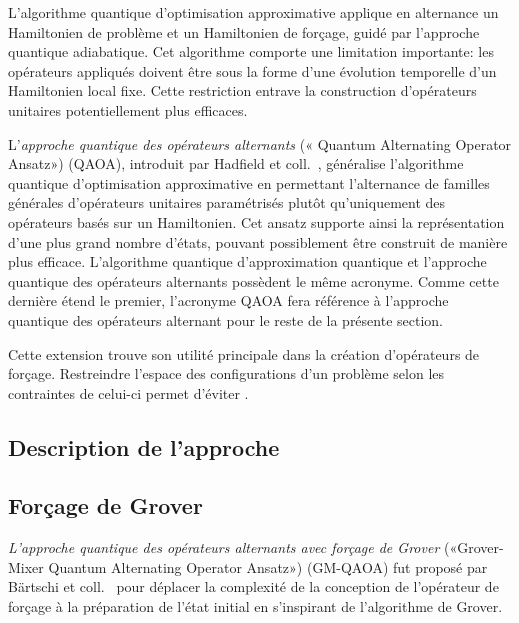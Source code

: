 L'algorithme quantique d'optimisation approximative applique en alternance un Hamiltonien de problème et un Hamiltonien de forçage, guidé par l'approche quantique adiabatique. Cet algorithme comporte une limitation importante: les opérateurs appliqués doivent être sous la forme d'une évolution temporelle d'un Hamiltonien local fixe. Cette restriction entrave la construction d'opérateurs unitaires potentiellement plus efficaces.

L'\textit{approche quantique des opérateurs alternants} (« Quantum Alternating Operator Ansatz») (QAOA), introduit par Hadfield et coll.~\cite{hadfieldQuantumApproximateOptimization2019}, généralise l'algorithme quantique d'optimisation approximative en permettant l'alternance de familles générales d'opérateurs unitaires paramétrisés plutôt qu'uniquement des opérateurs basés sur un Hamiltonien. Cet ansatz supporte ainsi la représentation d'une plus grand nombre d'états, pouvant possiblement être construit de manière plus efficace. L'algorithme quantique d'approximation quantique et l'approche quantique des opérateurs alternants possèdent le même acronyme. Comme cette dernière étend le premier, l'acronyme QAOA fera référence à l'approche quantique des opérateurs alternant pour le reste de la présente section.

Cette extension trouve son utilité principale dans la création d'opérateurs de forçage. Restreindre l'espace des configurations d'un problème selon les contraintes de celui-ci permet d'éviter .



\subsection{Description de l'approche}





\subsection{Forçage de Grover}

\textit{L'approche quantique des opérateurs alternants avec forçage de Grover} («Grover-Mixer Quantum Alternating Operator Ansatz») (GM-QAOA) fut proposé par Bärtschi et coll.~\cite{bartschiGroverMixersQAOA2020} pour déplacer la complexité de la conception de l'opérateur de forçage à la préparation de l'état initial en s'inspirant de l'algorithme de Grover. 



